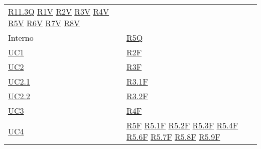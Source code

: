 \begin{center}
\begin{longtable}[!h]{m{50px} m{50px}}
        \newline \hyperref[tab:RequisitiQualita]{R11.3Q}
        \newline \hyperref[tab:RequisitiVincolo]{R1V}
        \newline \hyperref[tab:RequisitiVincolo]{R2V}
        \newline \hyperref[tab:RequisitiVincolo]{R3V}
        \newline \hyperref[tab:RequisitiVincolo]{R4V}
        \newline \hyperref[tab:RequisitiVincolo]{R5V}
        \newline \hyperref[tab:RequisitiVincolo]{R6V}
        \newline \hyperref[tab:RequisitiVincolo]{R7V}
        \newline \hyperref[tab:RequisitiVincolo]{R8V}                                   \\


        Interno                           &                                             %
        \hyperref[tab:RequisitiQualita]{R5Q}                                            \\

        \hyperref[sec:UC1]{UC1}           & \hyperref[tab:RequisitiFunzionali]{R2F}     \\

        \hyperref[sec:UC2]{UC2}           & \hyperref[tab:RequisitiFunzionali]{R3F}     \\
        \hyperref[sec:UC2.1]{UC2.1}       & \hyperref[tab:RequisitiFunzionali]{R3.1F}   \\
        \hyperref[sec:UC2.2]{UC2.2}       & \hyperref[tab:RequisitiFunzionali]{R3.2F}   \\

        \hyperref[sec:UC3]{UC3}           & \hyperref[tab:RequisitiFunzionali]{R4F}     \\

        \hyperref[sec:UC4]{UC4}           & \hyperref[tab:RequisitiFunzionali]{R5F}
        \newline \hyperref[tab:RequisitiFunzionali]{R5.1F}
        \newline \hyperref[tab:RequisitiFunzionali]{R5.2F}
        \newline \hyperref[tab:RequisitiFunzionali]{R5.3F}
        \newline \hyperref[tab:RequisitiFunzionali]{R5.4F}
        \newline \hyperref[tab:RequisitiFunzionali]{R5.6F}
        \newline \hyperref[tab:RequisitiFunzionali]{R5.7F}
        \newline \hyperref[tab:RequisitiFunzionali]{R5.8F}
        \newline \hyperref[tab:RequisitiFunzionali]{R5.9F}                              \\


\end{longtable}
\end{center}
